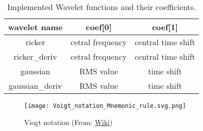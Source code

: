 \begin{table}[h!]
\centering
\caption{Implemented Wavelet functions and their coefficients.}
\label{table_wavelet}
\begin{tabular}{| c | c | c |}
\hline
   wavelet name  &   coef[0]    &   coef[1] \\
\hline
    ricker        &   cetral frequency  &  central time shift \\
\hline
   ricker\_deriv  &   cetral frequency  &  central time shift \\
\hline
    gaussian      &    RMS value  &  time shift \\
\hline
  gaussian\_deriv  &   RMS value  &  time shift \\
\hline
\end{tabular}
\end{table}


\begin{figure}
    \centering
    \texttt{[image: Voigt\_notation\_Mnemonic\_rule.svg.png]}
    \caption{Viogt notation (From: \href{https://en.wikipedia.org/wiki/Voigt_notation}{Wiki})}
    \label{fig_voigt}
\end{figure}


